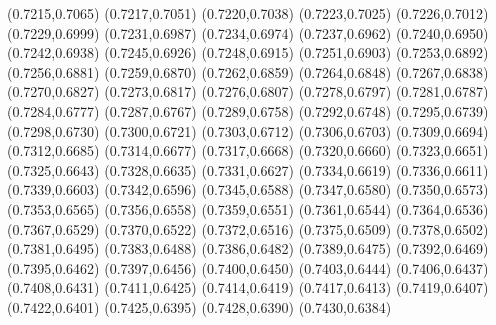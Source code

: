 \PST@Filltriangle(0.7215,0.7065)
\PST@Filltriangle(0.7217,0.7051)
\PST@Filltriangle(0.7220,0.7038)
\PST@Filltriangle(0.7223,0.7025)
\PST@Filltriangle(0.7226,0.7012)
\PST@Filltriangle(0.7229,0.6999)
\PST@Filltriangle(0.7231,0.6987)
\PST@Filltriangle(0.7234,0.6974)
\PST@Filltriangle(0.7237,0.6962)
\PST@Filltriangle(0.7240,0.6950)
\PST@Filltriangle(0.7242,0.6938)
\PST@Filltriangle(0.7245,0.6926)
\PST@Filltriangle(0.7248,0.6915)
\PST@Filltriangle(0.7251,0.6903)
\PST@Filltriangle(0.7253,0.6892)
\PST@Filltriangle(0.7256,0.6881)
\PST@Filltriangle(0.7259,0.6870)
\PST@Filltriangle(0.7262,0.6859)
\PST@Filltriangle(0.7264,0.6848)
\PST@Filltriangle(0.7267,0.6838)
\PST@Filltriangle(0.7270,0.6827)
\PST@Filltriangle(0.7273,0.6817)
\PST@Filltriangle(0.7276,0.6807)
\PST@Filltriangle(0.7278,0.6797)
\PST@Filltriangle(0.7281,0.6787)
\PST@Filltriangle(0.7284,0.6777)
\PST@Filltriangle(0.7287,0.6767)
\PST@Filltriangle(0.7289,0.6758)
\PST@Filltriangle(0.7292,0.6748)
\PST@Filltriangle(0.7295,0.6739)
\PST@Filltriangle(0.7298,0.6730)
\PST@Filltriangle(0.7300,0.6721)
\PST@Filltriangle(0.7303,0.6712)
\PST@Filltriangle(0.7306,0.6703)
\PST@Filltriangle(0.7309,0.6694)
\PST@Filltriangle(0.7312,0.6685)
\PST@Filltriangle(0.7314,0.6677)
\PST@Filltriangle(0.7317,0.6668)
\PST@Filltriangle(0.7320,0.6660)
\PST@Filltriangle(0.7323,0.6651)
\PST@Filltriangle(0.7325,0.6643)
\PST@Filltriangle(0.7328,0.6635)
\PST@Filltriangle(0.7331,0.6627)
\PST@Filltriangle(0.7334,0.6619)
\PST@Filltriangle(0.7336,0.6611)
\PST@Filltriangle(0.7339,0.6603)
\PST@Filltriangle(0.7342,0.6596)
\PST@Filltriangle(0.7345,0.6588)
\PST@Filltriangle(0.7347,0.6580)
\PST@Filltriangle(0.7350,0.6573)
\PST@Filltriangle(0.7353,0.6565)
\PST@Filltriangle(0.7356,0.6558)
\PST@Filltriangle(0.7359,0.6551)
\PST@Filltriangle(0.7361,0.6544)
\PST@Filltriangle(0.7364,0.6536)
\PST@Filltriangle(0.7367,0.6529)
\PST@Filltriangle(0.7370,0.6522)
\PST@Filltriangle(0.7372,0.6516)
\PST@Filltriangle(0.7375,0.6509)
\PST@Filltriangle(0.7378,0.6502)
\PST@Filltriangle(0.7381,0.6495)
\PST@Filltriangle(0.7383,0.6488)
\PST@Filltriangle(0.7386,0.6482)
\PST@Filltriangle(0.7389,0.6475)
\PST@Filltriangle(0.7392,0.6469)
\PST@Filltriangle(0.7395,0.6462)
\PST@Filltriangle(0.7397,0.6456)
\PST@Filltriangle(0.7400,0.6450)
\PST@Filltriangle(0.7403,0.6444)
\PST@Filltriangle(0.7406,0.6437)
\PST@Filltriangle(0.7408,0.6431)
\PST@Filltriangle(0.7411,0.6425)
\PST@Filltriangle(0.7414,0.6419)
\PST@Filltriangle(0.7417,0.6413)
\PST@Filltriangle(0.7419,0.6407)
\PST@Filltriangle(0.7422,0.6401)
\PST@Filltriangle(0.7425,0.6395)
\PST@Filltriangle(0.7428,0.6390)
\PST@Filltriangle(0.7430,0.6384)
